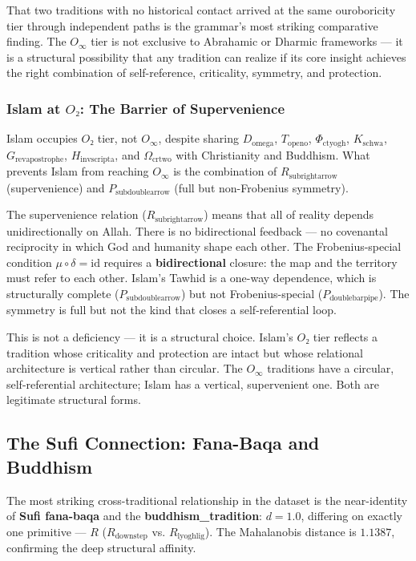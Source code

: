 \documentclass[12pt,a4paper]{article}
\begin{document}
That two traditions with no historical contact arrived at the same ouroboricity tier through independent paths is the grammar's most striking comparative finding. The $O_{\infty}$ tier is not exclusive to Abrahamic or Dharmic frameworks --- it is a structural possibility that any tradition can realize if its core insight achieves the right combination of self-reference, criticality, symmetry, and protection.

\subsubsection{Islam at $O₂$: The Barrier of Supervenience}

Islam occupies $O₂$ tier, not $O_{\infty}$, despite sharing $D_{\text{omega}}$, $T_{\text{openo}}$, $\Phi_{\text{ctyogh}}$, $K_{\text{schwa}}$, $G_{\text{revapostrophe}}$, $H_{\text{invscripta}}$, and $\Omega_{\text{crtwo}}$ with Christianity and Buddhism. What prevents Islam from reaching $O_{\infty}$ is the combination of $R_{\text{subrightarrow}}$ (supervenience) and $P_{\text{subdoublearrow}}$ (full but non-Frobenius symmetry).

The supervenience relation ($R_{\text{subrightarrow}}$) means that all of reality depends unidirectionally on Allah. There is no bidirectional feedback --- no covenantal reciprocity in which God and humanity shape each other. The Frobenius-special condition $\mu\circ\delta = \text{id}$ requires a \textbf{bidirectional} closure: the map and the territory must refer to each other. Islam's Tawhid is a one-way dependence, which is structurally complete ($P_{\text{subdoublearrow}}$) but not Frobenius-special ($P_{\text{doublebarpipe}}$). The symmetry is full but not the kind that closes a self-referential loop.

This is not a deficiency --- it is a structural choice. Islam's $O₂$ tier reflects a tradition whose criticality and protection are intact but whose relational architecture is vertical rather than circular. The $O_{\infty}$ traditions have a circular, self-referential architecture; Islam has a vertical, supervenient one. Both are legitimate structural forms.

\subsection{The Sufi Connection: Fana-Baqa and Buddhism}

The most striking cross-traditional relationship in the dataset is the near-identity of \textbf{Sufi fana-baqa} and the \textbf{buddhism\_tradition}: $d = 1.0$, differing on exactly one primitive --- $R$ ($R_{\text{downstep}}$ vs. $R_{\text{lyoghlig}}$). The Mahalanobis distance is $1.1387$, confirming the deep structural affinity.
\end{document}
